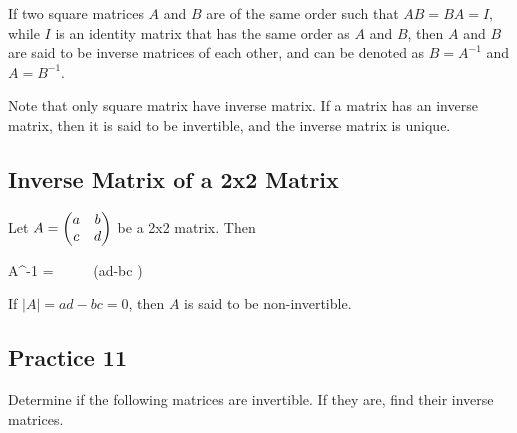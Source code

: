 \documentclass{report}
\begin{document}
\begin{multicols}{2}
  If two square matrices $A$ and $B$ are of the same order such that $AB=BA=I$,
  while $I$ is an identity matrix that has the same order as $A$ and $B$, then
  $A$ and $B$ are said to be inverse matrices of each other, and can be denoted
  as $B = A^{-1}$ and $A = B^{-1}$.

  Note that only square matrix have inverse matrix. If a matrix has an inverse
  matrix, then it is said to be invertible, and the inverse matrix is unique.

  \subsection*{Inverse Matrix of a 2x2 Matrix}

  Let $A = \begin{pmatrix} a & b \\ c & d \end{pmatrix}$ be a 2x2 matrix. Then
  \begin{cequation}
    A^{-1} =  
    \ \ \ \ \ (ad-bc )
  \end{cequation}

  If $|A| = ad - bc = 0$, then $A$ is said to be non-invertible.

  \subsection{Practice 11}

  Determine if the following matrices are invertible. If they are, find their
  inverse matrices.


\end{multicols}
\end{document}
